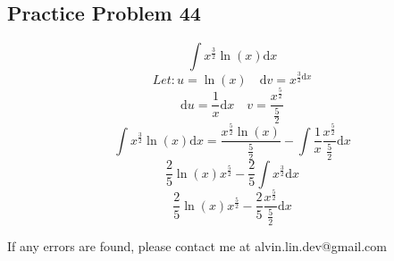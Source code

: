 \documentclass[letterpaper, 12pt]{article}
\newcommand*{\diff}{\mathrm{d}}
\begin{document}
\subsection*{Practice Problem 44}
\[ \int{x^{\frac{3}{2}}\ln(x)\diff{x}} \]
\[ Let: u = \ln(x) \quad \diff{v} = x^{\frac{3}{2}\diff{x}} \]
\[ \diff{u} = \frac{1}{x}\diff{x} \quad v =
   \frac{x^{\frac{5}{2}}}{\frac{5}{2}} \]
\[ \int{x^{\frac{3}{2}}\ln(x)\diff{x}}=
   \frac{x^{\frac{5}{2}}\ln(x)}{\frac{5}{2}}-
   \int{\frac{1}{x}\frac{x^{\frac{5}{2}}}{\frac{5}{2}}\diff{x}} \]
\[ \frac{2}{5}\ln(x)x^{\frac{5}{2}}-\frac{2}{5}\int{x^{\frac{3}{2}}\diff{x}} \]
\[ \frac{2}{5}\ln(x)x^{\frac{5}{2}}-
   \frac{2}{5}\frac{x^{\frac{5}{2}}}{\frac{5}{2}}\diff{x} \]

\begin{center}
  If any errors are found, please contact me at alvin.lin.dev@gmail.com
\end{center}
\end{document}
